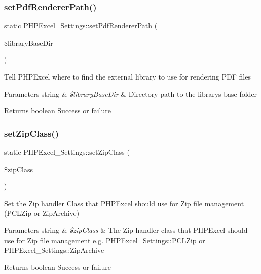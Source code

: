 \subsubsection{\texorpdfstring{set\+Pdf\+Renderer\+Path()}{setPdfRendererPath()}}
{\footnotesize\ttfamily static P\+H\+P\+Excel\+\_\+\+Settings\+::set\+Pdf\+Renderer\+Path (\begin{DoxyParamCaption}\item[{}]{\$library\+Base\+Dir }\end{DoxyParamCaption})\hspace{0.3cm}{\ttfamily [static]}}

Tell P\+H\+P\+Excel where to find the external library to use for rendering P\+DF files


\begin{DoxyParams}[1]{Parameters}
string & {\em \$library\+Base\+Dir} & Directory path to the library\textquotesingle{}s base folder \\
\hline
\end{DoxyParams}
\begin{DoxyReturn}{Returns}
boolean Success or failure 
\end{DoxyReturn}
\mbox{\label{classPHPExcel__Settings_ac32427c3ef323ba4050d8ed808a0bb9a}} 
\subsubsection{\texorpdfstring{set\+Zip\+Class()}{setZipClass()}}
{\footnotesize\ttfamily static P\+H\+P\+Excel\+\_\+\+Settings\+::set\+Zip\+Class (\begin{DoxyParamCaption}\item[{}]{\$zip\+Class }\end{DoxyParamCaption})\hspace{0.3cm}{\ttfamily [static]}}

Set the Zip handler Class that P\+H\+P\+Excel should use for Zip file management (P\+C\+L\+Zip or Zip\+Archive)


\begin{DoxyParams}[1]{Parameters}
string & {\em \$zip\+Class} & The Zip handler class that P\+H\+P\+Excel should use for Zip file management e.\+g. P\+H\+P\+Excel\+\_\+\+Settings\+::\+P\+C\+L\+Zip or P\+H\+P\+Excel\+\_\+\+Settings\+::\+Zip\+Archive \\
\hline
\end{DoxyParams}
\begin{DoxyReturn}{Returns}
boolean Success or failure 
\end{DoxyReturn}


